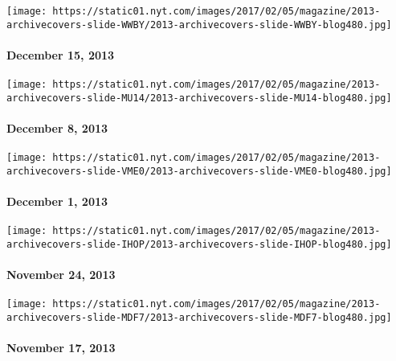 \texttt{[image: https://static01.nyt.com/images/2017/02/05/magazine/2013-archivecovers-slide-WWBY/2013-archivecovers-slide-WWBY-blog480.jpg]}

\hypertarget{december-15-2013}{%
\paragraph{December 15, 2013}\label{december-15-2013}}

\href{http://www.nytimes.com/indexes/2013/12/08/magazine/index.html}{}

\texttt{[image: https://static01.nyt.com/images/2017/02/05/magazine/2013-archivecovers-slide-MU14/2013-archivecovers-slide-MU14-blog480.jpg]}

\hypertarget{december-8-2013}{%
\paragraph{December 8, 2013}\label{december-8-2013}}

\href{http://www.nytimes.com/indexes/2013/12/01/magazine/index.html}{}

\texttt{[image: https://static01.nyt.com/images/2017/02/05/magazine/2013-archivecovers-slide-VME0/2013-archivecovers-slide-VME0-blog480.jpg]}

\hypertarget{december-1-2013}{%
\paragraph{December 1, 2013}\label{december-1-2013}}

\href{http://www.nytimes.com/indexes/2013/11/24/magazine/index.html}{}

\texttt{[image: https://static01.nyt.com/images/2017/02/05/magazine/2013-archivecovers-slide-IHOP/2013-archivecovers-slide-IHOP-blog480.jpg]}

\hypertarget{november-24-2013}{%
\paragraph{November 24, 2013}\label{november-24-2013}}

\href{http://www.nytimes.com/indexes/2013/11/17/magazine/index.html}{}

\texttt{[image: https://static01.nyt.com/images/2017/02/05/magazine/2013-archivecovers-slide-MDF7/2013-archivecovers-slide-MDF7-blog480.jpg]}

\hypertarget{november-17-2013}{%
\paragraph{November 17, 2013}\label{november-17-2013}}

